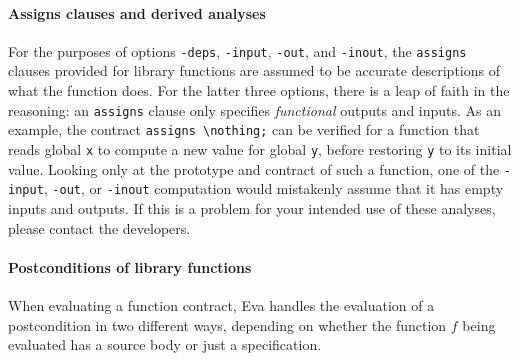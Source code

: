 \documentclass[web]{frama-c-book}
\newcommand{\Eva}{\textsf{Eva}}
\begin{document}
\paragraph{Assigns clauses and derived analyses}

For the purposes of options \lstinline|-deps|, \lstinline|-input|,
\lstinline|-out|, and \lstinline|-inout|, the \lstinline|assigns| 
clauses provided for
library functions are assumed to be accurate descriptions of what the
function does. For the latter three options, there is a
leap of faith in the reasoning: an \lstinline|assigns| clause only
specifies {\em functional} outputs and inputs. As an example, the contract 
\lstinline|assigns \nothing;| can be verified for a function that reads
global \lstinline|x| to compute a new value for global \lstinline|y|,
before restoring \lstinline|y| to its initial value. Looking only at the 
prototype and contract of such a function, one of the \lstinline|-input|,
\lstinline|-out|, or \lstinline|-inout| computation would mistakenly
assume that it has empty inputs and outputs.
%
If this is a problem for your intended use of these analyses,
please contact the developers.



\paragraph{Postconditions of library functions}

When evaluating a function contract, \Eva{} handles the
evaluation of a postcondition in two different ways, depending on
whether the function $f$ being evaluated has a source body or just a
specification.
\end{document}
